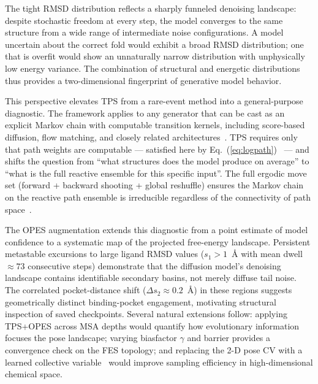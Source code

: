 \documentclass[aps,prl,twocolumn,superscriptaddress,floatfix]{revtex4-2}
\begin{document}
The tight RMSD distribution reflects a sharply funneled denoising landscape:
despite stochastic freedom at every step, the model converges to the same
structure from a wide range of intermediate noise configurations.  A model
uncertain about the correct fold would exhibit a broad RMSD distribution; one
that is overfit would show an unnaturally narrow distribution with unphysically
low energy variance.  The combination of structural and energetic distributions
thus provides a two-dimensional fingerprint of generative model behavior.

This perspective elevates TPS from a rare-event method into a general-purpose
diagnostic.  The framework applies to any generator that can be cast as an
explicit Markov chain with computable transition kernels, including score-based
diffusion, flow matching, and closely related
architectures~\cite{song2021,lipman2022}. TPS requires only that path weights
are computable --- satisfied here by Eq.~(\ref{eq:logpath})~\cite{falkner2023}
--- and shifts the question from ``what structures does the model produce on
average'' to ``what is the full reactive ensemble for this specific input''.
The full ergodic move set (forward + backward shooting + global reshuffle)
ensures the Markov chain on the reactive path ensemble is irreducible
regardless of the connectivity of path
space~\cite{falkner2024,buijsman2020}.

The OPES augmentation extends this diagnostic from a point estimate of model
confidence to a systematic map of the projected free-energy landscape.
Persistent metastable excursions to large ligand RMSD values ($s_1 > 1$~\AA{}
with mean dwell $\approx 73$ consecutive steps) demonstrate that the diffusion
model's denoising landscape contains identifiable secondary basins, not merely
diffuse tail noise.  The correlated pocket-distance shift ($\Delta s_2
\approx 0.2$~\AA{}) in these regions suggests geometrically distinct
binding-pocket engagement, motivating structural inspection of saved
checkpoints.  Several natural extensions follow: applying TPS+OPES across
MSA depths would quantify how evolutionary information focuses the pose
landscape; varying biasfactor $\gamma$ and barrier provides a convergence
check on the FES topology; and replacing the 2-D pose CV with a learned
collective variable~\cite{invernizzi2022} would improve sampling efficiency
in high-dimensional chemical space.
\end{document}
